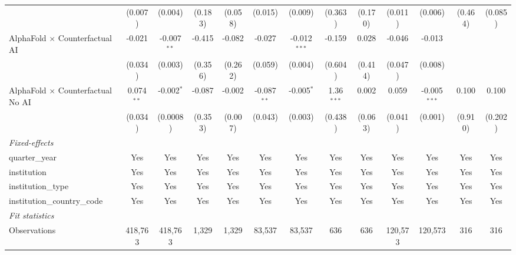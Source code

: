 \begin{tabular}{lcccccccccccc}
                                            & (0.007)       & (0.004)       & (0.183)       & (0.058) & (0.015)       & (0.009)        & (0.363)       & (0.170) & (0.011)       & (0.006)        & (0.464) & (0.085)\\   
   AlphaFold $\times$ Counterfactual AI     & -0.021        & -0.007$^{**}$ & -0.415        & -0.082  & -0.027        & -0.012$^{***}$ & -0.159        & 0.028   & -0.046        & -0.013         &         &   \\   
                                            & (0.034)       & (0.003)       & (0.356)       & (0.262) & (0.059)       & (0.004)        & (0.604)       & (0.414) & (0.047)       & (0.008)        &         &   \\   
   AlphaFold $\times$ Counterfactual No AI  & 0.074$^{**}$  & -0.002$^{*}$  & -0.087        & -0.002  & -0.087$^{**}$ & -0.005$^{*}$   & 1.36$^{***}$  & 0.002   & 0.059         & -0.005$^{***}$ & 0.100   & 0.100\\   
                                            & (0.034)       & (0.0008)      & (0.353)       & (0.007) & (0.043)       & (0.003)        & (0.438)       & (0.063) & (0.041)       & (0.001)        & (0.910) & (0.202)\\   
   \midrule
   \emph{Fixed-effects}\\
   quarter\_year                            & Yes           & Yes           & Yes           & Yes     & Yes           & Yes            & Yes           & Yes     & Yes           & Yes            & Yes     & Yes\\  
   institution                              & Yes           & Yes           & Yes           & Yes     & Yes           & Yes            & Yes           & Yes     & Yes           & Yes            & Yes     & Yes\\  
   institution\_type                        & Yes           & Yes           & Yes           & Yes     & Yes           & Yes            & Yes           & Yes     & Yes           & Yes            & Yes     & Yes\\  
   institution\_country\_code               & Yes           & Yes           & Yes           & Yes     & Yes           & Yes            & Yes           & Yes     & Yes           & Yes            & Yes     & Yes\\  
   \midrule
   \emph{Fit statistics}\\
   Observations                             & 418,763       & 418,763       & 1,329         & 1,329   & 83,537        & 83,537         & 636           & 636     & 120,573       & 120,573        & 316     & 316\\  

\end{tabular}
